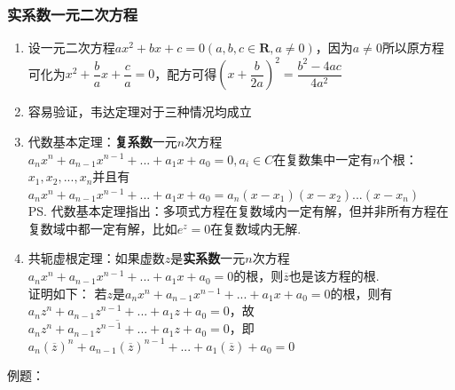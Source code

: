 \subsubsection*{实系数一元二次方程}
\begin{enumerate}
    \item 设一元二次方程$ax^2+bx+c = 0 (a,b,c \in \mathbf{R}, a \neq 0)$，因为$a \neq 0$所以原方程可化为$x^2 + \dfrac{b}{a}x + \dfrac{c}{a} = 0$，配方可得$\left(x+\dfrac{b}{2a}\right)^2 = \dfrac{b^2-4ac}{4a^2}$ 
    \item 容易验证，韦达定理对于三种情况均成立
    \item 代数基本定理：\textbf{复系数}一元$n$次方程$a_nx^n + a_{n-1}x^{n-1} + ... + a_1x+a_0 = 0, a_i \in C$在复数集中一定有$n$个根：$x_1, x_2, ..., x_n$并且有$a_nx^n + a_{n-1}x^{n-1} + ... + a_1x+a_0 = a_n(x-x_1)(x-x_2) ... (x-x_n)$ \\
    \ps 代数基本定理指出：多项式方程在复数域内一定有解，但并非所有方程在复数域中都一定有解，比如$e^z = 0$在复数域内无解.
    \item 共轭虚根定理：如果虚数$z$是\textbf{实系数}一元$n$次方程$a_nx^n + a_{n-1}x^{n-1} + ... + a_1x+a_0 = 0$的根，则$\overline{z}$也是该方程的根. \\
    证明如下：
    若$z$是$a_nx^n + a_{n-1}x^{n-1} + ... + a_1x+a_0 = 0$的根，则有$a_nz^n + a_{n-1}z^{n-1} + ... + a_1z+a_0 = 0$，故$\overline{a_nz^n + a_{n-1}z^{n-1} + ... + a_1z+a_0} = 0$，即$a_n(\overline{z})^n + a_{n-1}(\overline{z})^{n-1} + ... + a_1(\overline{z})+a_0 = 0$
\end{enumerate}
例题：
